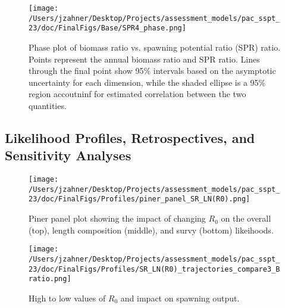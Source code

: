 \documentclass[11pt,
  letterpaper,
]{article}
\begin{document}
\begin{figure}
{\centering
\texttt{[image: /Users/jzahner/Desktop/Projects/assessment\_models/pac\_sspt\_23/doc/FinalFigs/Base/SPR4\_phase.png]}
}
\caption{Phase plot of biomass ratio vs. spawning potential ratio (SPR) ratio. Points represent the annual biomass ratio and SPR ratio. Lines through the final point show 95\% intervals based on the asymptotic uncertainty for each dimension, while the shaded ellipse is a 95\% region accoutninf for estimated correlation between the two quantities.\label{fig:phase_diagram}}
\end{figure}

\clearpage

\hypertarget{likelihood-profiles-retrospectives-and-sensitivity-analyses}{%
\subsection{Likelihood Profiles, Retrospectives, and Sensitivity Analyses}\label{likelihood-profiles-retrospectives-and-sensitivity-analyses}}

\begin{figure}
{\centering
\texttt{[image: /Users/jzahner/Desktop/Projects/assessment\_models/pac\_sspt\_23/doc/FinalFigs/Profiles/piner\_panel\_SR\_LN(R0).png]}
}
\caption{Piner panel plot showing the impact of changing $R_0$ on the overall (top), length composition (middle), and survy (bottom) likeihoods.\label{fig:R0_prof}}
\end{figure}

\begin{figure}
{\centering
\texttt{[image: /Users/jzahner/Desktop/Projects/assessment\_models/pac\_sspt\_23/doc/FinalFigs/Profiles/SR\_LN(R0)\_trajectories\_compare3\_Bratio.png]}
}
\caption{High to low values of $R_0$ and impact on spawning output.\label{fig:R0_spawnout}}
\end{figure}
\end{document}
